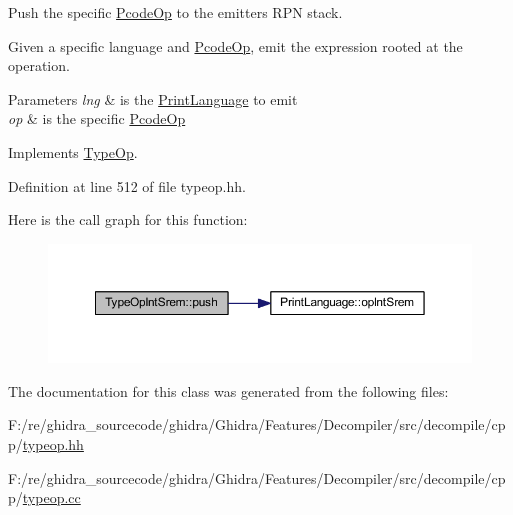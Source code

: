 Push the specific \mbox{\hyperlink{class_pcode_op}{Pcode\+Op}} to the emitter\textquotesingle{}s R\+PN stack. 

Given a specific language and \mbox{\hyperlink{class_pcode_op}{Pcode\+Op}}, emit the expression rooted at the operation. 
\begin{DoxyParams}{Parameters}
{\em lng} & is the \mbox{\hyperlink{class_print_language}{Print\+Language}} to emit \\
\hline
{\em op} & is the specific \mbox{\hyperlink{class_pcode_op}{Pcode\+Op}} \\
\hline
\end{DoxyParams}


Implements \mbox{\hyperlink{class_type_op_ac9c9544203ed74dabe6ac662b653b2af}{Type\+Op}}.



Definition at line 512 of file typeop.\+hh.

Here is the call graph for this function\+:
\nopagebreak
\begin{figure}[H]
\begin{center}
\leavevmode
\includegraphics[width=350pt]{class_type_op_int_srem_a142ba3344986bb407eca6f71efd85cb8_cgraph}
\end{center}
\end{figure}


The documentation for this class was generated from the following files\+:\begin{DoxyCompactItemize}
\item 
F\+:/re/ghidra\+\_\+sourcecode/ghidra/\+Ghidra/\+Features/\+Decompiler/src/decompile/cpp/\mbox{\hyperlink{typeop_8hh}{typeop.\+hh}}\item 
F\+:/re/ghidra\+\_\+sourcecode/ghidra/\+Ghidra/\+Features/\+Decompiler/src/decompile/cpp/\mbox{\hyperlink{typeop_8cc}{typeop.\+cc}}\end{DoxyCompactItemize}
